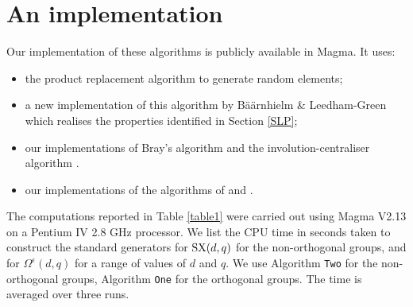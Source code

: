 \documentclass[12pt]{article}
\def\SX{{\rm SX}}
\begin{document}
\section{An implementation}\label{implementation}
Our implementation of these algorithms is publicly available in {\sc Magma}.
It uses:
\begin{itemize}
\item 
the product replacement algorithm \cite{Celleretal95}
to generate random elements;  
\item a new implementation of this algorithm by
B\"a\"arnhielm \& Leedham-Green \cite{prospector}
which realises the properties 
identified in Section \ref{SLP};
\item our implementations of Bray's algorithm \cite{Bray}
and the involution-centraliser algorithm \cite{Ryba-paper}.
\item our implementations of the algorithms of \cite{Conderetal05}
and \cite{sl3q}.
\end{itemize}

The computations reported in Table \ref{table1} were carried out
using {\sc Magma} V2.13 on a Pentium IV 2.8 GHz processor.
We list the CPU time in seconds taken to construct 
the standard generators for $\SX(d, q)$ for the 
non-orthogonal groups, 
and for $\Omega^\epsilon(d, q)$ for a range of values of $d$ and $q$.
We use Algorithm {\tt Two} for the non-orthogonal 
groups,  Algorithm {\tt One} for the orthogonal groups.
The time is averaged over three runs.
\end{document}
